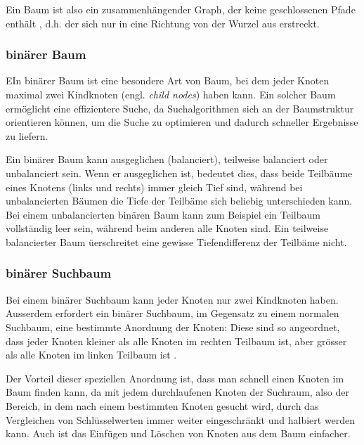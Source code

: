\documentclass[a4paper,11pt]{article}
\begin{document}

Ein Baum ist also ein zusammenhängender Graph, der keine geschlossenen Pfade enthält \cite{graphs}, d.h. der sich nur in eine Richtung von der Wurzel aus erstreckt.

\subsubsection{binärer Baum}

EIn binärer Baum ist eine besondere Art von Baum, bei dem jeder Knoten maximal zwei Kindknoten (engl. \emph{child nodes}) haben kann. Ein solcher Baum ermöglicht eine effizientere Suche, da Suchalgorithmen sich an der Baumstruktur orientieren können, um die Suche zu optimieren und dadurch schneller Ergebnisse zu liefern. 

Ein binärer Baum kann ausgeglichen (balanciert), teilweise balanciert oder unbalanciert sein. Wenn er ausgeglichen ist, bedeutet dies, dass beide Teilbäume eines Knotens (links und rechts) immer gleich Tief sind, während bei unbalancierten Bäumen die Tiefe der Teilbäme sich beliebig unterschieden kann. Bei einem unbalancierten binären Baum kann zum Beispiel ein Teilbaum vollständig leer sein, während beim anderen alle Knoten sind. Ein teilweise balancierter Baum üerschreitet eine gewisse Tiefendifferenz der Teilbäme nicht.

\subsubsection{binärer Suchbaum}
Bei einem binärer Suchbaum kann jeder Knoten nur zwei Kindknoten haben. Ausserdem erfordert ein binärer Suchbaum, im Gegensatz zu einem normalen Suchbaum, eine bestimmte Anordnung der Knoten: Diese sind so angeordnet, dass jeder Knoten kleiner als alle Knoten im rechten Teilbaum ist, aber grösser als alle Knoten im linken Teilbaum ist \cite{c2_algorithms}.

Der Vorteil dieser speziellen Anordnung ist, dass man schnell einen Knoten im Baum finden kann, da mit jedem durchlaufenen Knoten der Suchraum, also der Bereich, in dem nach einem bestimmten Knoten gesucht wird, durch das Vergleichen von Schlüsselwerten immer weiter eingeschränkt und halbiert werden kann. Auch ist das Einfügen und Löschen von Knoten aus dem Baum einfacher. 
\end{document}
